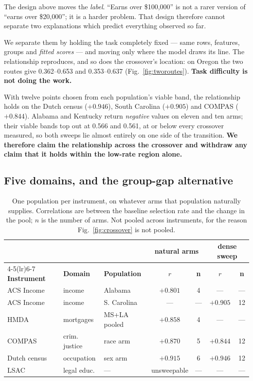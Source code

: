 \documentclass[conference]{IEEEtran}
\begin{document}
The design above moves the \emph{label}. ``Earns over \$100{,}000'' is not a rarer version of
``earns over \$20{,}000''; it is a harder problem. That design therefore cannot separate two
explanations which predict everything observed so far.

We separate them by holding the task completely fixed --- same rows, features, groups and
\emph{fitted scores} --- and moving only where the model draws its line. The relationship
reproduces, and so does the crossover's location: on Oregon the two routes give 0.362--0.653
and 0.353--0.637 (Fig.~\ref{fig:tworoutes}). \textbf{Task difficulty is not doing the work.}

With twelve points chosen from each population's viable band, the relationship holds on the
Dutch census ($+0.946$), South Carolina ($+0.905$) and COMPAS ($+0.844$). Alabama and Kentucky
return \emph{negative} values on eleven and ten arms; their viable bands top out at 0.566 and
0.561, at or below every crossover measured, so both sweeps lie almost entirely on one side of
the transition. \textbf{We therefore claim the relationship across the crossover and withdraw
any claim that it holds within the low-rate region alone.}

\subsection{Five domains, and the group-gap alternative}

\begin{table}[!t]
\caption{One population per instrument, on whatever arms that population naturally supplies.
Correlations are between the baseline selection rate and the change in the pool; $n$ is the
number of arms. Not pooled across instruments, for the reason Fig.~\ref{fig:crossover} is not
pooled.}
\label{tab:domains}
\centering
\scriptsize
\setlength{\tabcolsep}{2.5pt}
\begin{tabular}{@{}lllcccc@{}}
\toprule
& & & \multicolumn{2}{c}{\textbf{natural arms}} & \multicolumn{2}{c}{\textbf{dense sweep}} \\
\cmidrule(lr){4-5}\cmidrule(lr){6-7}
\textbf{Instrument} & \textbf{Domain} & \textbf{Population} & \textbf{$r$} & \textbf{n} &
\textbf{$r$} & \textbf{n} \\
\midrule
ACS Income & income & Alabama & $+0.801$ & 4 & --- & --- \\
ACS Income & income & S. Carolina & --- & --- & $+0.905$ & 12 \\
HMDA & mortgages & MS+LA pooled & $+0.858$ & 4 & --- & --- \\
COMPAS & crim. justice & race arm & $+0.870$ & 5 & $+0.844$ & 12 \\
Dutch census & occupation & sex arm & $+0.915$ & 6 & $+0.946$ & 12 \\
LSAC & legal educ. & --- & unsweepable & --- & --- & --- \\
\bottomrule
\end{tabular}
\end{table}
\end{document}
